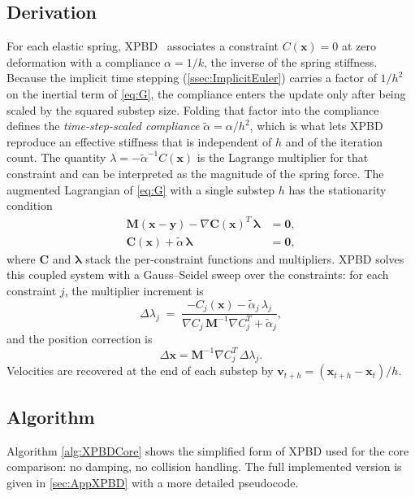 \subsection{Derivation}
\label{ssec:XPBDDeriv}
For each elastic spring, XPBD~\cite{10.1145/2994258.2994272} associates a constraint $C(\mathbf{x}) = 0$ at zero
deformation with a compliance $\alpha = 1/k$, the inverse of the spring stiffness.
Because the implicit time stepping (\autoref{ssec:ImplicitEuler}) carries a factor
of $1/h^{2}$ on the inertial term of \eqref{eq:G}, the compliance enters the update
only after being scaled by the squared substep size. Folding that factor into the
compliance defines the \emph{time-step-scaled compliance}
$\tilde{\alpha} = \alpha / h^{2}$, which is what lets XPBD reproduce an effective
stiffness that is independent of $h$ and of the iteration count. The quantity
$\lambda = -\tilde{\alpha}^{-1} C(\mathbf{x})$ is the Lagrange multiplier for that constraint and
can be interpreted as the magnitude of the spring force. The augmented Lagrangian
of \eqref{eq:G} with a single substep $h$ has the stationarity condition
\begin{align}
    \mathbf{M}(\mathbf{x} - \mathbf{y}) - \nabla \mathbf{C}(\mathbf{x})^{T}\,\boldsymbol{\lambda} &= \mathbf{0}, \\
    \mathbf{C}(\mathbf{x}) + \tilde{\alpha}\,\boldsymbol{\lambda} &= \mathbf{0},
\end{align}
where $\mathbf{C}$ and $\boldsymbol{\lambda}$ stack the per-constraint functions and
multipliers. XPBD solves this
coupled system with a Gauss--Seidel sweep over the constraints: for each
constraint $j$, the multiplier increment is
\begin{equation}
    \label{eq:XPBDLambda}
    \Delta \lambda_{j} \;=\; \frac{-C_{j}(\mathbf{x}) - \tilde{\alpha}_{j}\, \lambda_{j}}
                                {\nabla C_{j}\,\mathbf{M}^{-1}\nabla C_{j}^{T}
                                 + \tilde{\alpha}_{j}},
\end{equation}
and the position correction is
\begin{equation}
    \Delta \mathbf{x} = \mathbf{M}^{-1}\nabla C_{j}^{T}\,\Delta \lambda_{j}.
\end{equation}
Velocities are recovered at the end of each substep by
$\mathbf{v}_{t+h} = (\mathbf{x}_{t+h} - \mathbf{x}_{t}) / h$.

\subsection{Algorithm}
\label{ssec:XPBDPseudo}
Algorithm \autoref{alg:XPBDCore} shows the simplified form of XPBD used for the core
comparison: no damping, no collision handling.
The full implemented version is given in \autoref{sec:AppXPBD} with a more detailed pseudocode.

